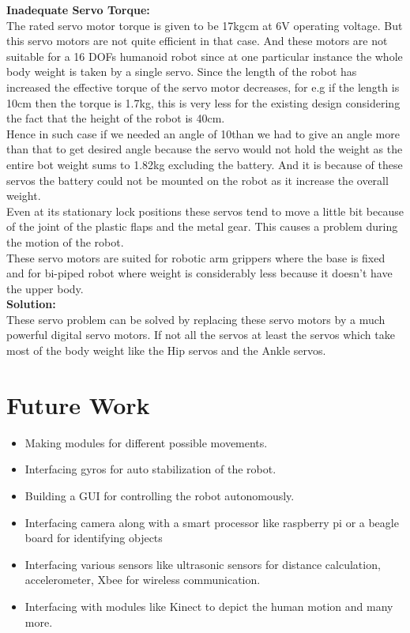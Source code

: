 \documentclass[12pt]{article}
\begin{document}
 \flushleft  \textbf{Inadequate Servo Torque:}\\
 The rated servo motor torque is given to be 17kgcm at 6V operating voltage. But this servo motors are not quite efficient in that case. And these motors are not suitable for a 16 DOFs humanoid robot since at one particular instance the whole body weight is taken by a single servo. Since the length of the robot has increased the effective torque of the servo motor decreases, for e.g if the length is 10cm then the torque is 1.7kg, this is very less for the existing design considering the fact that the height of the robot is 40cm.\\
 Hence in such case if we needed an angle of 10\degree than we had to give an angle more than that to get desired angle because the servo would not hold the weight as the entire bot weight sums to 1.82kg excluding the battery. And it is because of these servos the battery could not be mounted on the robot as it increase the overall weight.\\
 Even at its stationary lock positions these servos tend to move a little bit because of the joint of the plastic flaps and the metal gear. This causes a problem during the motion of the robot.\\ 
 These servo motors are suited for robotic arm grippers where the base is fixed and for bi-piped robot where weight is considerably less because it doesn't have the upper body.\\
    
\flushleft \textbf{Solution:}\\
These servo problem can be solved by replacing these servo motors by a much powerful digital servo motors. If not all the servos at least the servos which take most of the body weight like the Hip servos and the Ankle servos.
 \newpage
 
 \section{Future Work}
 \begin{itemize}
 	\item Making modules for different possible movements.
 	\item Interfacing gyros for auto stabilization of the robot.
 	\item Building a GUI for controlling the robot autonomously.
 	\item Interfacing camera along with a smart processor like raspberry pi or a beagle board for identifying objects
 	\item Interfacing various sensors like ultrasonic sensors for distance calculation,
 	accelerometer, Xbee for wireless communication. 
 	\item Interfacing with modules like Kinect to depict the human motion and many more.
 \end{itemize}
 
\end{document}
